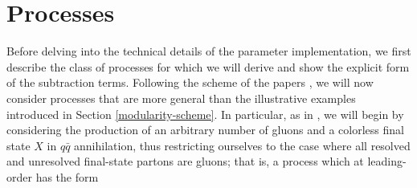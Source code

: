 \documentclass[a4paper, 12pt]{book}
\begin{document}
\section{Processes}
Before delving into the technical details of the parameter implementation, we first describe the class of processes for which we will derive and show the explicit form of the subtraction terms. Following the scheme of the papers \cite{Devoto:2023rpv,Devoto:2025kin}, we will now consider processes that are more general than the illustrative examples introduced in Section \ref{modularity-scheme}. In particular, as in \cite{Devoto:2023rpv}, we will begin by considering the production of an arbitrary number of gluons and a colorless final state $X$ in $q \bar{q}$ annihilation, thus restricting ourselves to the case where all resolved and unresolved final-state partons are gluons; that is, a process which at leading-order has the form
\end{document}
